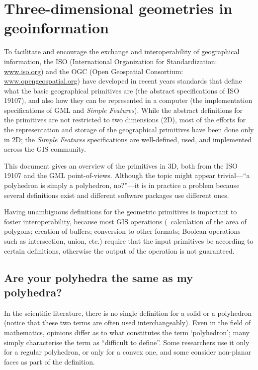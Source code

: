 
\setchapterpreamble[u]{\margintoc}

\graphicspath{{iso19107/}}

\chapter{Three-dimensional geometries in geoinformation}%
\label{chap:iso19107}

To facilitate and encourage the exchange and interoperability of geographical information, the ISO (International Organization for Standardization: \url{www.iso.org}) and the OGC (Open Geospatial Consortium: \url{www.opengeospatial.org}) have developed in recent years standards that define what the basic geographical primitives are (the abstract specifications of ISO 19107), and also how they can be represented in a computer (the implementation specifications of GML and \emph{Simple Features}). 
While the abstract definitions for the primitives are not restricted to two dimensions (2D), most of the efforts for the representation and storage of the geographical primitives have been done only in 2D; the \emph{Simple Features} specifications are well-defined, used, and implemented across the GIS community.

This document gives an overview of the primitives in 3D, both from the ISO 19107 and the GML point-of-views.
Although the topic might appear trivial---``a polyhedron is simply a polyhedron, no?''---it is in practice a problem because several definitions exist and different software packages use different ones.

Having unambiguous definitions for the geometric primitives is important to foster interoperability, because most GIS operations (\eg\ calculation of the area of polygons; creation of buffers; conversion to other formats; Boolean operations such as intersection, union, etc.) require that the input primitives be according to certain definitions, otherwise the output of the operation is not guaranteed.

%
\section[Same as my polyhedra?]{Are your polyhedra the same as my polyhedra?}%
\label{sec:definition}

In the scientific literature, there is no single definition for a solid or a polyhedron (notice that these two terms are often used interchangeably).
Even in the field of mathematics, opinions differ as to what constitutes the term `polyhedron'; many simply characterise the term as ``difficult to define''. 
Some researchers use it only for a regular polyhedron, or only for a convex one, and some consider non-planar faces as part of the definition.


